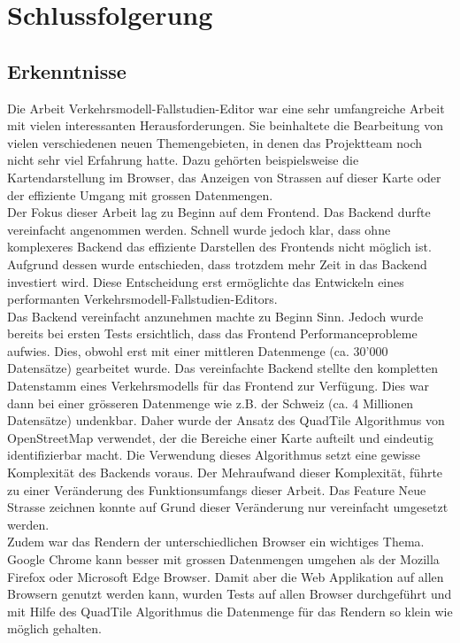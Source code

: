 \chapter{Schlussfolgerung}
\section{Erkenntnisse}
Die Arbeit \glqq{}Verkehrsmodell-Fallstudien-Editor\grqq{} war eine sehr umfangreiche Arbeit mit vielen interessanten Herausforderungen. Sie beinhaltete die Bearbeitung von vielen verschiedenen neuen Themengebieten, in denen das Projektteam noch nicht sehr viel Erfahrung hatte. Dazu gehörten beispielsweise die Kartendarstellung im Browser, das Anzeigen von Strassen auf dieser Karte oder der effiziente Umgang mit grossen Datenmengen.\\
Der Fokus dieser Arbeit lag zu Beginn auf dem Frontend. Das Backend durfte vereinfacht angenommen werden. Schnell wurde jedoch klar, dass ohne komplexeres Backend das effiziente Darstellen des Frontends nicht möglich ist. Aufgrund dessen wurde entschieden, dass trotzdem mehr Zeit in das Backend investiert wird. Diese Entscheidung erst ermöglichte das Entwickeln eines performanten Verkehrsmodell-Fallstudien-Editors.\\
Das Backend vereinfacht anzunehmen machte zu Beginn Sinn. Jedoch wurde bereits bei ersten Tests ersichtlich, dass das Frontend Performanceprobleme aufwies. Dies, obwohl erst mit einer mittleren Datenmenge (ca. 30'000 Datensätze) gearbeitet wurde. Das vereinfachte Backend stellte den kompletten Datenstamm eines Verkehrsmodells für das Frontend zur Verfügung. Dies war dann bei einer grösseren Datenmenge wie z.B. der Schweiz (ca. 4 Millionen Datensätze) undenkbar. Daher wurde der Ansatz des QuadTile Algorithmus von OpenStreetMap \cite{OSMQuadTiles} verwendet, der die Bereiche einer Karte aufteilt und eindeutig identifizierbar macht. Die Verwendung dieses Algorithmus setzt eine gewisse Komplexität des Backends voraus. Der Mehraufwand dieser Komplexität, führte zu einer Veränderung des Funktionsumfangs dieser Arbeit. Das Feature \glqq{}Neue Strasse zeichnen\grqq{} konnte auf Grund dieser Veränderung nur vereinfacht umgesetzt werden.\\
Zudem war das Rendern der unterschiedlichen Browser ein wichtiges Thema. Google Chrome kann besser mit grossen Datenmengen umgehen als der Mozilla Firefox oder Microsoft Edge Browser. Damit aber die Web Applikation auf allen Browsern genutzt werden kann, wurden Tests auf allen Browser durchgeführt und mit Hilfe des QuadTile Algorithmus die Datenmenge für das Rendern so klein wie möglich gehalten.\\
